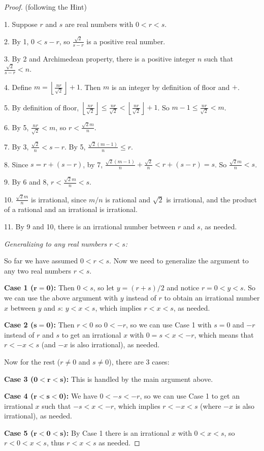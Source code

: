 \documentclass[14pt]{extarticle}
\newcommand{\dps}{\displaystyle}
\newcommand{\floor}[1]{{\left\lfloor#1\right\rfloor}}
\begin{document}
\begin{proof}
    (following the Hint)

    1. Suppose $r$ and $s$ are real numbers with \(0 < r < s\).

    2. By 1, \(0 < s - r\), so \(\dps \frac{\sqrt{2}}{s-r}\) is a positive real number.

    3. By 2 and Archimedean property, there is a positive integer $n$ such that \(\dps \frac{\sqrt{2}}{s-r} < n\).

    4. Define \(\dps m = \floor{\frac{nr}{\sqrt{2}}} + 1\). Then $m$ is an integer by definition of floor and $+$.

    5. By definition of floor, \(\dps \floor{\frac{nr}{\sqrt{2}}} \leq \frac{nr}{\sqrt{2}} < \floor{\frac{nr}
        {\sqrt{2}}}+1\). So \(\dps m-1 \leq\frac{nr}{\sqrt{2}}<m\).

    6. By 5, \(\dps\frac{nr}{\sqrt{2}} < m\), so \(\dps r < \frac{\sqrt{2}m}{n}\).

    7. By 3, \(\dps \frac{\sqrt{2}}{n} < s-r\). By 5, \(\dps \frac{\sqrt{2}(m-1)}{n} \leq r\).

    8. Since \(s = r + (s-r)\), by 7, \(\dps \frac{\sqrt{2}(m-1)}{n} + \frac{\sqrt{2}}{n} < r + (s-r) = s\). So
    \(\dps \frac{\sqrt{2}m}{n} < s\).

    9. By 6 and 8, \(\dps r < \frac{\sqrt{2}m}{n} < s\).

    10. \(\dps \frac{\sqrt{2}m}{n}\) is irrational, since $m/n$ is rational and $\sqrt{2}$ is irrational, and the product
    of a rational and an irrational is irrational.

    11. By 9 and 10, there is an irrational number between $r$ and $s$, as needed.

        {\it Generalizing to any real numbers $r < s$:}

    So far we have assumed \(0 < r < s\). Now we need to generalize the argument to any two real numbers $r < s$.

        {\bf Case 1 ($\bm{r = 0}$):} Then $0 < s$, so let \(y = (r+s) / 2\) and notice $r = 0 < y < s$. So we can use the
    above argument with $y$ instead of $r$ to obtain an irrational number $x$ between $y$ and $s$: \(y < x < s\),
    which implies \(r < x < s\), as needed.

        {\bf Case 2 ($\bm{s = 0}$):} Then $r < 0$ so $0 < -r$, so we can use Case 1 with $s = 0$ and $-r$ instead of $r$ and
    $s$ to get an irrational $x$ with \(0 = s < x < -r\), which means that \(r < -x < s\) (and $-x$ is also irrational),
    as needed.

    Now for the rest ($r \neq 0$ and $s \neq 0$), there are 3 cases:

    {\bf Case 3 (\(\bm{0 < r < s}\)):} This is handled by the main argument above.

        {\bf Case 4 (\(\bm{r < s < 0}\)):} We have \(0 < -s < -r\), so we can use Case 1 to get an irrational $x$ such that
    \(-s < x < -r\), which implies \(r < -x < s\) (where $-x$ is also irrational), as needed.

        {\bf Case 5 (\(\bm{r < 0 < s}\)):} By Case 1 there is an irrational $x$ with \(0 < x < s\), so \(r < 0 < x < s\),
    thus \(r < x < s\) as needed.
\end{proof}
\end{document}
